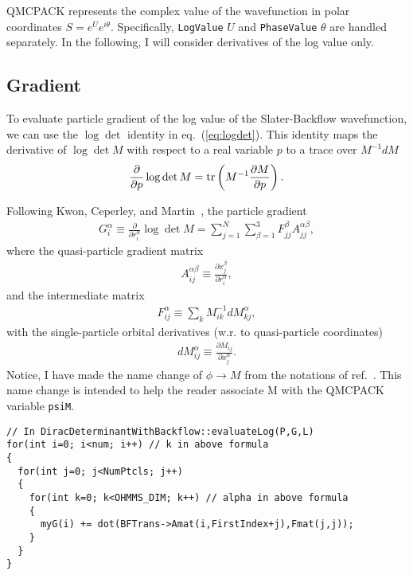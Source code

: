 QMCPACK represents the complex value of the wavefunction in polar coordinates $S=e^Ue^{i\theta}$. Specifically, \verb|LogValue| $U$ and \verb|PhaseValue| $\theta$ are handled separately. In the following, I will consider derivatives of the log value only.

\subsection{Gradient}
To evaluate particle gradient of the log value of the Slater-Backflow wavefunction, we can use the $\log\det$ identity in eq.~(\ref{eq:logdet}). This identity maps the derivative of $\log\det M$ with respect to a real variable $p$ to a trace over $M^{-1}dM$
\begin{align}
\frac{\partial}{\partial p}\log\det M = \text{tr}\left( M^{-1} \frac{\partial M}{\partial p} \right) \label{eq:logdet}.
\end{align}

Following Kwon, Ceperley, and Martin~\cite{Kwon1993backflow}, the particle gradient
\begin{align}
G_i^\alpha \equiv \frac{\partial}{\partial r_i^\alpha} \log\det M = \sum\limits_{j=1}^N \sum\limits_{\beta=1}^3 F_{jj}^\beta A_{jj}^{\alpha\beta}, \label{eq:grad}
\end{align}
where the quasi-particle gradient matrix
\begin{align}
A_{ij}^{\alpha\beta} \equiv \frac{\partial x_j^\beta}{\partial r_i^\alpha},
\end{align}
and the intermediate matrix
\begin{align}
F_{ij}^\alpha\equiv\sum\limits_k M^{-1}_{ik} dM_{kj}^\alpha,
\end{align}
with the single-particle orbital derivatives (w.r. to quasi-particle coordinates)
\begin{align}
dM_{ij}^\alpha \equiv \frac{\partial M_{ij}}{\partial x_j^\alpha}.
\end{align}
Notice, I have made the name change of $\phi\rightarrow M$ from the notations of ref.~\cite{Kwon1993backflow}. This name change is intended to help the reader associate M with the QMCPACK variable \verb|psiM|.
\begin{lstlisting}
// In DiracDeterminantWithBackflow::evaluateLog(P,G,L)
for(int i=0; i<num; i++) // k in above formula
{
  for(int j=0; j<NumPtcls; j++)
  {
    for(int k=0; k<OHMMS_DIM; k++) // alpha in above formula
    {
      myG(i) += dot(BFTrans->Amat(i,FirstIndex+j),Fmat(j,j));
    }
  }
}
\end{lstlisting}

